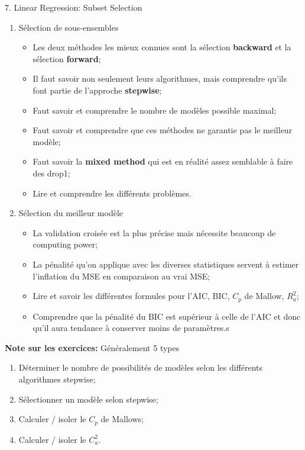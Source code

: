 \documentclass[12pt, titlepage, french]{report}
\begin{document}
\begin{CHPT_SUMM}[label = {VALID-SUBSETS}]{7. Linear Regression:  Subset Selection}
\begin{enumerate}
	\item	Sélection de sous-ensembles
	\begin{itemize}
		\item	Les deux méthodes les mieux connues sont la sélection \textbf{backward} et la sélection \textbf{forward};
		\item	Il faut savoir non seulement leurs algorithmes, mais comprendre qu'ils font partie de l'approche \textbf{stepwise};
		\item	Faut savoir et comprendre le nombre de modèles possible maximal;
		\item	Faut savoir et comprendre que ces méthodes ne garantie pas le meilleur modèle;
		\item	Faut savoir la \textbf{mixed method} qui est en réalité assez semblable à faire des drop1;
		\item	Lire et comprendre les différents problèmes.
	\end{itemize}
	\item	Sélection du meilleur modèle
	\begin{itemize}
		\item	La validation croisée est la plus précise mais nécessite beaucoup de computing power;
		\item	La pénalité qu'on applique avec les diverses statistiques servent à estimer l'inflation du MSE en comparaison au vrai MSE;
		\item	Lire et savoir les différentes formules pour l'AIC, BIC, $C_{p}$ de Mallow, $R^{2}_{a}$;
		\item	Comprendre que la pénalité du BIC est supérieur à celle de l'AIC et donc qu'il aura tendance à conserver moins de paramètres.s
	\end{itemize}
\end{enumerate}
\textbf{Note sur les exercices:} Généralement 5 types
\begin{enumerate}
	\item	Déterminer le nombre de possibilités de modèles selon les différents algorithmes stepwise;
	\item	Sélectionner un modèle selon stepwise;
	\item	Calculer / isoler le $C_{p}$ de Mallows;
	\item	Calculer / isoler le $C_{a}^{2}$.
\end{enumerate}
\end{CHPT_SUMM}
\end{document}
